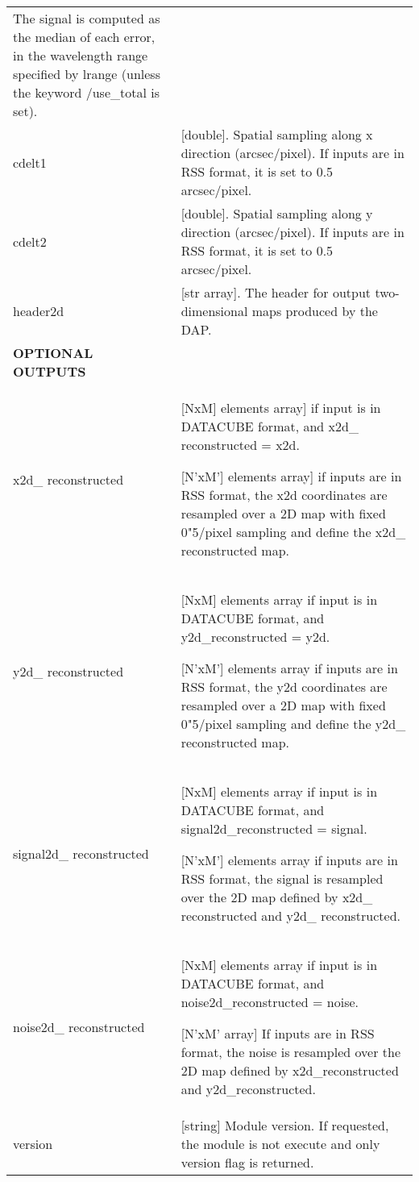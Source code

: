 \begin{center}
\begin{longtable}{p{2.7cm}| p{11.1cm}}
               The signal is computed as the median of each error, in the wavelength range specified by lrange (unless the keyword /use\_total is set).\\
%               
cdelt1         & [double].        Spatial sampling along x direction (arcsec/pixel). If inputs are in RSS format, it is set to 0.5 arcsec/pixel.  \\
%               
cdelt2         & [double].        Spatial sampling along y direction (arcsec/pixel). If inputs are in RSS format, it is set to 0.5 arcsec/pixel.  \\
%               
header2d       & [str array].     The header for output two-dimensional maps produced by the DAP. \\
\hline
{\bf  OPTIONAL OUTPUTS} &  \\
\hline
%
 x2d\_ reconstructed  &   [NxM] elements array]   if input is in DATACUBE format,  and x2d\_ reconstructed = x2d.

                          [N'xM'] elements array] if inputs are in RSS format, the x2d coordinates are resampled over a 2D map with fixed 0"5/pixel sampling
                                     and define the  x2d\_ reconstructed map.\\
%
 y2d\_ reconstructed &    [NxM] elements array   if input is in DATACUBE format,  and y2d\_reconstructed = y2d.

                          [N'xM'] elements array if inputs are in RSS format, the y2d coordinates are resampled over a 2D map with fixed 0"5/pixel sampling
                                     and define the  y2d\_ reconstructed map.\\
%
 signal2d\_ reconstructed  &  [NxM] elements array if input is in DATACUBE format, and  signal2d\_reconstructed = signal.

                         [N'xM'] elements array if inputs are in RSS format, the signal is resampled over the 2D map defined by
                                         x2d\_ reconstructed  and y2d\_ reconstructed. \\
%
 noise2d\_ reconstructed  &   [NxM] elements array if input is in DATACUBE format, and noise2d\_reconstructed = noise.

                        [N'xM' array] If inputs are in RSS format, the noise is resampled over the 2D map defined by
                                         x2d\_reconstructed  and y2d\_reconstructed. \\
%
 version   & [string]            Module version. If requested, the module is not execute and only version flag is returned.\\
%
\hline
\end{longtable}
\end{center}

